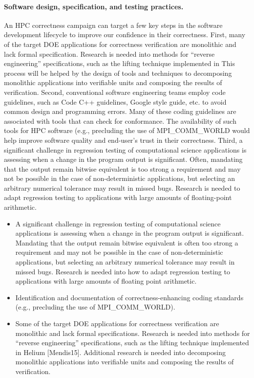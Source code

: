 \paragraph{Software design, specification, and testing practices.}
%
%
An HPC correctness campaign can target a few key steps in the software development lifecycle to improve our confidence in their correctness. First, many of the target DOE applications for correctness verification are monolithic and lack formal specification.  Research is needed into methods for ``reverse engineering'' specifications, such as the lifting technique implemented in   This process will be helped by the design of tools and techniques to decomposing monolithic applications into verifiable units and composing the results of verification.
%
Second, conventional software engineering teams employ code guidelines, such as Code C++ guidelines, Google style guide, etc. to avoid common design and programming errors. Many of these coding guidelines are associated with tools that can check for conformance. The availability of such tools for HPC software (e.g., precluding the use of \textsf{MPI\_{}COMM\_{}WORLD} would help improve software quality and end-user's trust in their correctness.
%
Third, a significant challenge in regression testing of computational science applications is assessing when a change in the program output is significant.  Often, mandating that the output remain bitwise equivalent is too strong a requirement and may not be possible in the case of non-deterministic applications, but selecting an arbitrary numerical tolerance may result in missed bugs.  Research is needed to adapt regression testing to applications with large amounts of floating-point arithmetic.

\begin{itemize}
\item  A significant challenge in regression testing of computational science applications is assessing when a change in the program output is significant.  Mandating that the output remain bitwise equivalent is often too strong a requirement and may not be possible in the case of non-deterministic applications, but selecting an arbitrary numerical tolerance may result in missed bugs.  Research is needed into how to adapt regression testing to applications with large amounts of floating point arithmetic.


\item Identification and documentation of correctness-enhancing coding standards (e.g., precluding the use of MPI\_COMM\_WORLD).

\item Some of the target DOE applications for correctness verification are monolithic and lack formal specifications.  Research is needed into methods for “reverse engineering” specifications, such as the lifting technique implemented in Helium [Mendis15].  Additional research is needed into decomposing monolithic applications into verifiable units and composing the results of verification.
\end{itemize}
\fi

